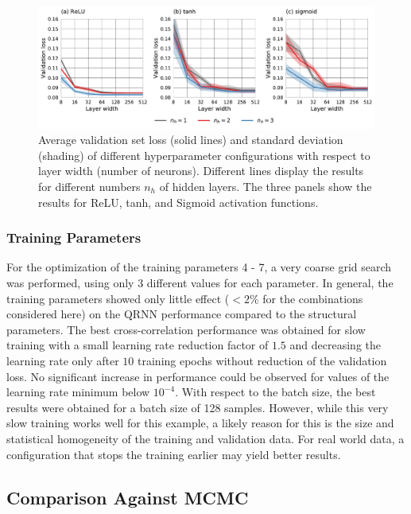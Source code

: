 \documentclass[journal abbreviation, manuscript]{copernicus}
\begin{document}
  \begin{figure}[hbpt!]
    \centering
    \includegraphics[width = 1.0\linewidth]{../plots/hyperparams}
    \caption{Average validation set loss (solid lines) and standard deviation (shading)
             of different hyperparameter configurations with respect to layer width (number of neurons).
             Different lines display the results for different numbers $n_h$ of hidden layers.
             The three panels show the results for ReLU, tanh, and Sigmoid activation functions.}
    \label{fig:hyperparams}
  \end{figure}

 \subsubsection{Training Parameters}
 
For the optimization of the training parameters 4 - 7, a very coarse grid
search was performed, using only 3 different values for each parameter.
In general, the training parameters showed only little effect ($< 2\%$ for the
combinations considered here) on the QRNN performance compared to the structural
parameters. The best cross-correlation performance was obtained for slow
training with a small learning rate reduction factor of $1.5$ and decreasing the
learning rate only after $10$ training epochs without reduction of the
validation loss. No significant increase in performance could be observed for
values of the learning rate minimum below $10^{-4}$. With respect to the batch
size, the best results were obtained for a batch size of 128 samples. However,
while this very slow training works well for this example, a likely reason for
this is the size and statistical homogeneity of the training and validation
data. For real world data, a configuration that stops the training earlier 
may yield better results.

\subsection{Comparison Against MCMC}
  
\end{document}
